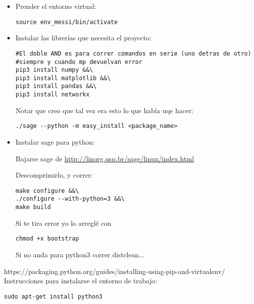 \documentclass[10pt,a4paper]{report}
\begin{document}
\begin{itemize}
\item Prender el entorno virtual:

\begin{lstlisting}
source env_messi/bin/activate
\end{lstlisting}

\item Instalar las librerías que necesita el proyecto:

\begin{lstlisting}
#El doble AND es para correr comandos en serie (uno detras de otro)
#siempre y cuando mp devuelvan error
pip3 install numpy &&\
pip3 install matplotlib &&\
pip3 install pandas &&\
pip3 install networkx
\end{lstlisting}

Notar que creo que tal vez era esto lo que había uqe hacer:

\begin{lstlisting}
./sage --python -m easy_install <package_name>
\end{lstlisting}

\item Instalar sage para python:

Bajarse sage de \url{http://linorg.usp.br/sage/linux/index.html}

Descomprimirlo, y correr:

\begin{lstlisting}
make configure &&\
./configure --with-python=3 &&\
make build
\end{lstlisting}

Si te tira error  yo lo arreglé con

\begin{lstlisting}
chmod +x bootstrap
\end{lstlisting}

Si no anda para python3 correr distclean...

\end{itemize}



https://packaging.python.org/guides/installing-using-pip-and-virtualenv/
Instrucciones para instalarse el entorno de trabajo:


\begin{lstlisting}
sudo apt-get install python3
\end{lstlisting}
\end{document}
